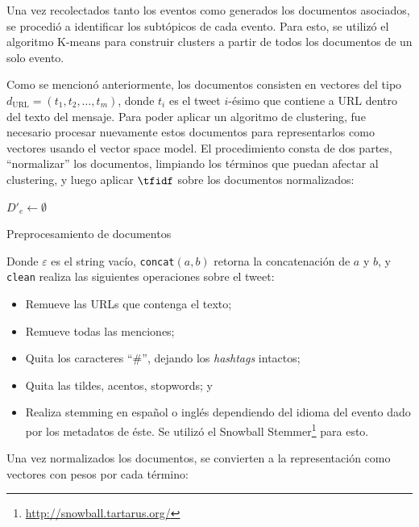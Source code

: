 \documentclass[upright, contnum]{umemoria}
\begin{document}
    Una vez recolectados tanto los eventos como generados los
    documentos asociados, se procedió a identificar los subtópicos de
    cada evento. Para esto, se utilizó el algoritmo K-means para
    construir clusters a partir de todos los documentos de un solo
    evento.

    Como se mencionó anteriormente, los documentos consisten en
    vectores del tipo $d_{\textrm{URL}}=(t_1,t_2,\ldots,t_m)$, donde
    $t_i$ es el tweet $i$-ésimo que contiene a URL dentro del texto
    del mensaje. Para poder aplicar un algoritmo de clustering, fue
    necesario procesar nuevamente estos documentos para representarlos
    como vectores usando el vector space model. El procedimiento
    consta de dos partes, ``normalizar'' los documentos, limpiando los
    términos que puedan afectar al clustering, y luego aplicar
    $\tfidf$ sobre los documentos normalizados:

\begin{algorithm}[H]
 $D'_e \leftarrow \emptyset$\; 
 \caption{Preprocesamiento de documentos}
\end{algorithm}
    
    Donde $\varepsilon$ es el string vacío, \texttt{concat}$(a,b)$ retorna
    la concatenación de $a$ y $b$, y \texttt{clean} realiza las siguientes
    operaciones sobre el tweet:

\begin{itemize}
\item Remueve las URLs que contenga el texto;
\item Remueve todas las menciones;
\item Quita los caracteres ``\#'', dejando los \emph{hashtags} intactos;
\item Quita las tildes, acentos, stopwords; y
\item Realiza stemming en español o inglés dependiendo del idioma del
      evento dado por los metadatos de éste. Se utilizó el Snowball
      Stemmer\footnote{\href{http://snowball.tartarus.org/}{http://snowball.tartarus.org/} } para esto.
\end{itemize}
    Una vez normalizados los documentos, se convierten a la
    representación como vectores con pesos por cada término:
\end{document}
